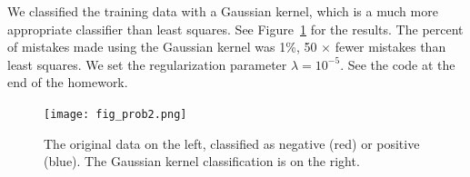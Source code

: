 \documentclass{article}
\begin{document}
\begin{homeworkProblem}
   
    We classified the training data with a Gaussian kernel, which is a much
    more appropriate classifier than least squares. See Figure~\ref{fig:prob2}
    for the results. The percent of mistakes made using the Gaussian kernel was
    1\%, 50 $\times$ fewer mistakes than least squares. We set the
    regularization parameter $\lambda = 10^{-5}$. See the code at the end of
    the homework. 

    \begin{figure}[!ht]
        
        \begin{centering}
        \texttt{[image: fig\_prob2.png]}

        \caption{\label{fig:prob2} The original data on the left, classified as
        negative (red) or positive (blue). The Gaussian kernel classification
    is on the right.}
        \end{centering}

    \end{figure} 

\end{homeworkProblem}
\end{document}
